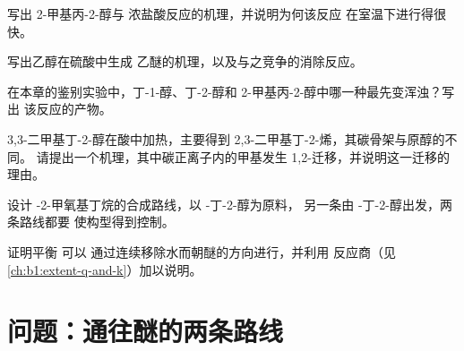 \begin{exercise}[$\star\star$]\label{exo:b1:alcohol-activation:7}
写出 2-甲基丙-2-醇与
浓盐酸反应的机理，并说明为何该反应
在室温下进行得很快。
\end{exercise}

\begin{exercise}[$\star\star$]\label{exo:b1:alcohol-activation:8}
写出乙醇在硫酸中生成
乙醚的机理，以及与之竞争的消除反应。
\end{exercise}

\begin{exercise}[$\star\star$]\label{exo:b1:alcohol-activation:9}
在本章的鉴别实验中，丁-1-醇、丁-2-醇和
2-甲基丙-2-醇中哪一种最先变浑浊？写出
该反应的产物。
\end{exercise}

\begin{exercise}[$\star\star\star$]\label{exo:b1:alcohol-activation:10}
3,3-二甲基丁-2-醇在酸中加热，主要得到
2,3-二甲基丁-2-烯，其碳骨架与原醇的不同。
请提出一个机理，其中碳正离子内的甲基发生
1,2-迁移，并说明这一迁移的理由。
\end{exercise}

\begin{exercise}[$\star\star\star$]\label{exo:b1:alcohol-activation:11}
设计 -2-甲氧基丁烷的合成路线，以 -丁-2-醇为原料，
另一条由 -丁-2-醇出发，两条路线都要
使构型得到控制。
\end{exercise}

\begin{exercise}[$\star\star\star$]\label{exo:b1:alcohol-activation:12}
证明平衡  可以
通过连续移除水而朝醚的方向进行，并利用
反应商（见\cref{ch:b1:extent-q-and-k}）加以说明。
\end{exercise}

\section{问题：通往醚的两条路线}

